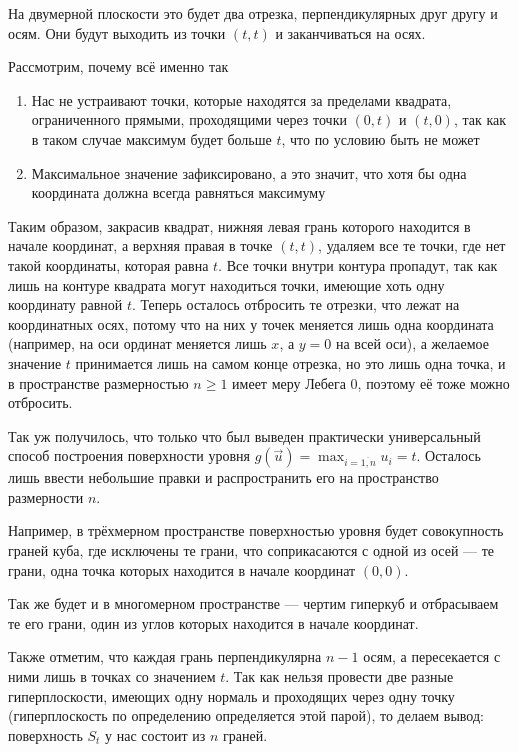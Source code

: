 На двумерной плоскости это будет два отрезка,
перпендикулярных друг другу и осям.
Они будут выходить из точки $\left( t, t \right)$
и заканчиваться на осях.

Рассмотрим, почему всё именно так
\begin{enumerate}
    \item Нас не устраивают точки, которые находятся за пределами
        квадрата, ограниченного прямыми, проходящими через точки
        $\left( 0, t \right)$ и $\left( t, 0 \right)$,
        так как в таком случае максимум будет больше $t$,
        что по условию быть не может
    \item Максимальное значение зафиксировано, а это значит,
        что хотя бы одна координата должна
        всегда равняться максимуму
\end{enumerate}

Таким образом, закрасив квадрат, нижняя левая грань которого
находится в начале координат, а верхняя правая в точке $\left( t, t \right)$,
удаляем все те точки, где нет такой координаты, которая равна $t$.
Все точки внутри контура пропадут, так как лишь на контуре квадрата
могут находиться точки, имеющие хоть одну координату равной $t$.
Теперь осталось отбросить те отрезки, что лежат на координатных осях,
потому что на них у точек меняется лишь одна координата
(например, на оси ординат меняется лишь $x$, а $y=0$ на всей оси),
а желаемое значение $t$ принимается лишь на самом конце отрезка,
но это лишь одна точка, и в пространстве размерностью $n \ge 1$
имеет меру Лебега $0$, поэтому её тоже можно отбросить.

Так уж получилось, что только что был выведен
практически универсальный способ построения поверхности уровня
$g\left( \vec{u} \right) = \max_{i=\overline{1,n}} u_i = t$.
Осталось лишь ввести небольшие правки и распространить его на
пространство размерности $n$.

Например, в трёхмерном пространстве поверхностью уровня будет
совокупность граней куба, где исключены те грани,
что соприкасаются с одной из осей --- те грани, одна точка которых
находится в начале координат $\left( 0, 0 \right)$.

Так же будет и в многомерном пространстве --- чертим гиперкуб
и отбрасываем те его грани, один из углов которых находится в начале координат.

Также отметим, что каждая грань перпендикулярна $n-1$ осям,
а пересекается с ними лишь в точках со значением $t$.
Так как нельзя провести две разные гиперплоскости, имеющих одну нормаль
и проходящих через одну точку (гиперплоскость по определению
определяется этой парой), то делаем вывод:
поверхность $S_t$ у нас состоит из $n$ граней.


